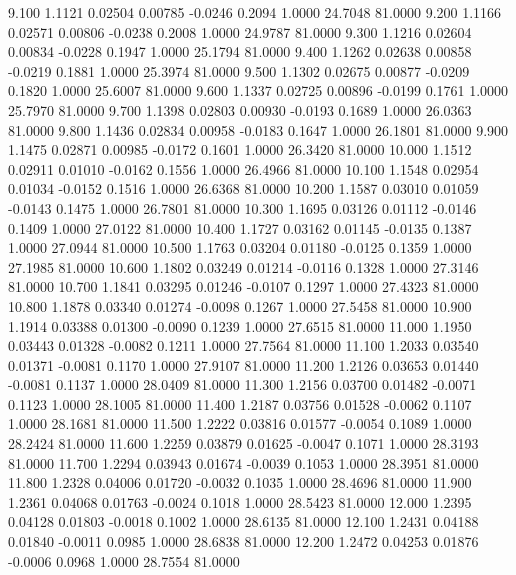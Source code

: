    9.100   1.1121   0.02504   0.00785  -0.0246   0.2094   1.0000  24.7048  81.0000
   9.200   1.1166   0.02571   0.00806  -0.0238   0.2008   1.0000  24.9787  81.0000
   9.300   1.1216   0.02604   0.00834  -0.0228   0.1947   1.0000  25.1794  81.0000
   9.400   1.1262   0.02638   0.00858  -0.0219   0.1881   1.0000  25.3974  81.0000
   9.500   1.1302   0.02675   0.00877  -0.0209   0.1820   1.0000  25.6007  81.0000
   9.600   1.1337   0.02725   0.00896  -0.0199   0.1761   1.0000  25.7970  81.0000
   9.700   1.1398   0.02803   0.00930  -0.0193   0.1689   1.0000  26.0363  81.0000
   9.800   1.1436   0.02834   0.00958  -0.0183   0.1647   1.0000  26.1801  81.0000
   9.900   1.1475   0.02871   0.00985  -0.0172   0.1601   1.0000  26.3420  81.0000
  10.000   1.1512   0.02911   0.01010  -0.0162   0.1556   1.0000  26.4966  81.0000
  10.100   1.1548   0.02954   0.01034  -0.0152   0.1516   1.0000  26.6368  81.0000
  10.200   1.1587   0.03010   0.01059  -0.0143   0.1475   1.0000  26.7801  81.0000
  10.300   1.1695   0.03126   0.01112  -0.0146   0.1409   1.0000  27.0122  81.0000
  10.400   1.1727   0.03162   0.01145  -0.0135   0.1387   1.0000  27.0944  81.0000
  10.500   1.1763   0.03204   0.01180  -0.0125   0.1359   1.0000  27.1985  81.0000
  10.600   1.1802   0.03249   0.01214  -0.0116   0.1328   1.0000  27.3146  81.0000
  10.700   1.1841   0.03295   0.01246  -0.0107   0.1297   1.0000  27.4323  81.0000
  10.800   1.1878   0.03340   0.01274  -0.0098   0.1267   1.0000  27.5458  81.0000
  10.900   1.1914   0.03388   0.01300  -0.0090   0.1239   1.0000  27.6515  81.0000
  11.000   1.1950   0.03443   0.01328  -0.0082   0.1211   1.0000  27.7564  81.0000
  11.100   1.2033   0.03540   0.01371  -0.0081   0.1170   1.0000  27.9107  81.0000
  11.200   1.2126   0.03653   0.01440  -0.0081   0.1137   1.0000  28.0409  81.0000
  11.300   1.2156   0.03700   0.01482  -0.0071   0.1123   1.0000  28.1005  81.0000
  11.400   1.2187   0.03756   0.01528  -0.0062   0.1107   1.0000  28.1681  81.0000
  11.500   1.2222   0.03816   0.01577  -0.0054   0.1089   1.0000  28.2424  81.0000
  11.600   1.2259   0.03879   0.01625  -0.0047   0.1071   1.0000  28.3193  81.0000
  11.700   1.2294   0.03943   0.01674  -0.0039   0.1053   1.0000  28.3951  81.0000
  11.800   1.2328   0.04006   0.01720  -0.0032   0.1035   1.0000  28.4696  81.0000
  11.900   1.2361   0.04068   0.01763  -0.0024   0.1018   1.0000  28.5423  81.0000
  12.000   1.2395   0.04128   0.01803  -0.0018   0.1002   1.0000  28.6135  81.0000
  12.100   1.2431   0.04188   0.01840  -0.0011   0.0985   1.0000  28.6838  81.0000
  12.200   1.2472   0.04253   0.01876  -0.0006   0.0968   1.0000  28.7554  81.0000
